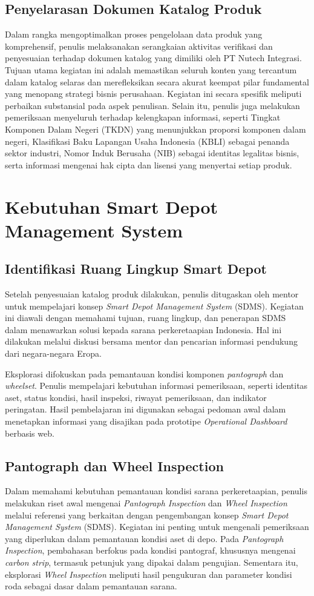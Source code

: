 \subsection{Penyelarasan Dokumen Katalog Produk}
Dalam rangka mengoptimalkan proses pengelolaan data produk yang komprehensif, penulis melaksanakan serangkaian aktivitas verifikasi dan penyesuaian terhadap dokumen katalog yang dimiliki oleh PT Nutech Integrasi. Tujuan utama kegiatan ini adalah memastikan seluruh konten yang tercantum dalam katalog selaras dan merefleksikan secara akurat keempat pilar fundamental yang menopang strategi bisnis perusahaan. Kegiatan ini secara spesifik meliputi perbaikan substansial pada aspek penulisan. Selain itu, penulis juga melakukan pemeriksaan menyeluruh terhadap kelengkapan informasi, seperti Tingkat Komponen Dalam Negeri (TKDN) yang menunjukkan proporsi komponen dalam negeri, Klasifikasi Baku Lapangan Usaha Indonesia (KBLI) sebagai penanda sektor industri, Nomor Induk Berusaha (NIB) sebagai identitas legalitas bisnis, serta informasi mengenai hak cipta dan lisensi yang menyertai setiap produk.

\section{Kebutuhan Smart Depot Management System}
\subsection{Identifikasi Ruang Lingkup Smart Depot}
Setelah penyesuaian katalog produk dilakukan, penulis ditugaskan oleh mentor untuk mempelajari konsep \textit{Smart Depot Management System} (SDMS). Kegiatan ini diawali dengan memahami tujuan, ruang lingkup, dan penerapan SDMS dalam menawarkan solusi kepada sarana perkeretaapian Indonesia. Hal ini dilakukan melalui diskusi bersama mentor dan pencarian informasi pendukung dari negara-negara Eropa.

Eksplorasi difokuskan pada pemantauan kondisi komponen \textit{pantograph} dan \textit{wheelset}. Penulis mempelajari kebutuhan informasi pemeriksaan, seperti identitas aset, status kondisi, hasil inspeksi, riwayat pemeriksaan, dan indikator peringatan. Hasil pembelajaran ini digunakan sebagai pedoman awal dalam menetapkan informasi yang disajikan pada prototipe \textit{Operational Dashboard} berbasis web.

\subsection{Pantograph dan Wheel Inspection}
Dalam memahami kebutuhan pemantauan kondisi sarana perkeretaapian, penulis melakukan riset awal mengenai \textit{Pantograph Inspection} dan \textit{Wheel Inspection} melalui referensi yang berkaitan dengan pengembangan konsep \textit{Smart Depot Management System} (SDMS). Kegiatan ini penting untuk mengenali pemeriksaan yang diperlukan dalam pemantauan kondisi aset di depo. Pada \textit{Pantograph Inspection}, pembahasan berfokus pada kondisi pantograf, khususnya mengenai \textit{carbon strip}, termasuk petunjuk yang dipakai dalam pengujian. Sementara itu, eksplorasi \textit{Wheel Inspection} meliputi hasil pengukuran dan parameter kondisi roda sebagai dasar dalam pemantauan sarana.

